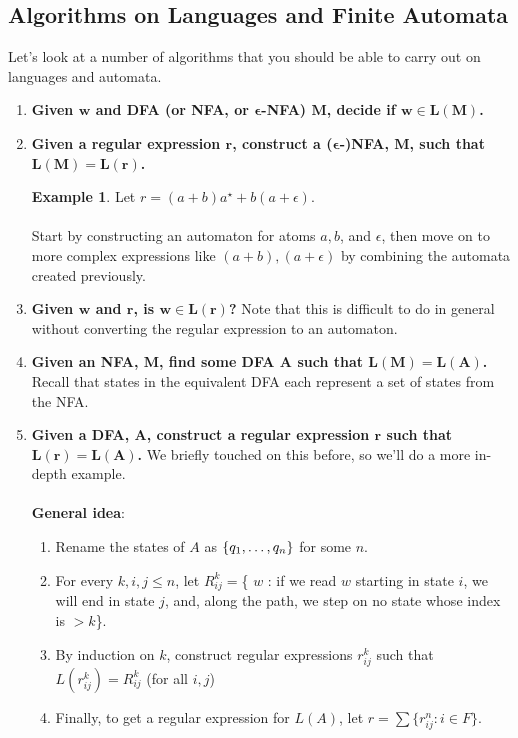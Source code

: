 \documentclass[]{article}
\DeclarePairedDelimiter{\set}{\lbrace}{\rbrace}
\theoremstyle{definition}
\newtheorem{ex}{Example}[section]
\newcommand{\lecture}[1]{\marginpar{{\footnotesize $\leftarrow$ \underline{#1}}}}
\begin{document}
      \subsection{Algorithms on Languages and Finite Automata} \lecture{October 10, 2013}
        Let's look at a number of algorithms that you should be able to carry out on languages and automata.

        \begin{enumerate}
          \item \textbf{Given $\boldsymbol{w}$ and DFA (or NFA, or $\boldsymbol{\epsilon}$-NFA) $\boldsymbol{M}$, decide if $\boldsymbol{w \in L(M)}$.}
          \item \textbf{Given a regular expression $\boldsymbol{r}$, construct a ($\boldsymbol{\epsilon}$-)NFA, $\boldsymbol{M}$, such that $\boldsymbol{L(M) = L(r)}$.}
          \begin{ex}
            Let $r = (a + b) a^\star + b(a + \epsilon)$.
            \\ \\
            Start by constructing an automaton for atoms $a, b$, and $\epsilon$, then move on to more complex expressions like $(a + b), (a + \epsilon)$ by combining the automata created previously.
          \end{ex}

          \item \textbf{Given $\boldsymbol{w}$ and $\boldsymbol{r}$, is $\boldsymbol{w \in L(r)}$?} Note that this is difficult to do in general without converting the regular expression to an automaton.

          \item \textbf{Given an NFA, $\boldsymbol{M}$, find some DFA $\boldsymbol{A}$ such that $\boldsymbol{L(M) = L(A)}$.} Recall that states in the equivalent DFA each represent a set of states from the NFA.

          \item \textbf{Given a DFA, $\boldsymbol{A}$, construct a regular expression $\boldsymbol{r}$ such that $\boldsymbol{L(r) = L(A)}$.} We briefly touched on this before, so we'll do a more in-depth example.
          \\ \\
          \textbf{General idea}:
          \begin{enumerate}
            \item Rename the states of $A$ as $\set{ q_1, \ldots, q_n }$ for some $n$.
            \item For every $k, i, j \le n$, let $R_{ij}^k = $\{ $w$ : if we read $w$ starting in state $i$, we will end in state $j$, and, along the path, we step on no state whose index is $> k$\}.
            \item By induction on $k$, construct regular expressions $r_{ij}^k$ such that $L(r_{ij}^k) = R_{ij}^k$ (for all $i, j$)
            \item Finally, to get a regular expression for $L(A)$, let $r = \sum \{ r_{ij}^n : i \in F \}$.
          \end{enumerate}


\end{enumerate}
\end{document}
